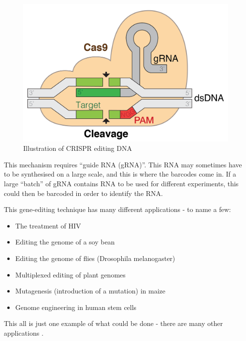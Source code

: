 \documentclass[a4paper,11pt]{article}
\begin{document}
\begin{figure}[H]
\begin{center}
\includegraphics{../images/GRNA-Cas9.png}
\end{center}
\caption{Illustration of CRISPR editing DNA}\label{figcrispr}
\end{figure}

    This mechanism requires ``guide RNA (gRNA)''. This RNA may sometimes have to
    be synthesised on a large scale, and this is where the barcodes come in. If
    a large ``batch'' of gRNA contains RNA to be used for different experiments,
    this could then be barcoded in order to identify the RNA.

    This gene-editing technique has many different applications - to name a few:

    \begin{itemize}
    \item The treatment of HIV \cite{RNAHIV2014Hu}
    \item Editing the genome of a soy bean \cite{Soybean2015Li}
    \item Editing the genome of flies (Drosophila melanogaster)
          \cite{Flies2013Ren}
    \item Multiplexed editing of plant genomes \cite{PlantToolbox2015Lowder}
    \item Mutagenesis (introduction of a mutation) in maize
          \cite{Maize2015Svitashev}
    \item Genome engineering in human stem cells \cite{StemCells2013Hou}
    \end{itemize}

    This all is just one example of what could be done - there are many other
    applications \cite{WikiBarcoding}.
\end{document}

